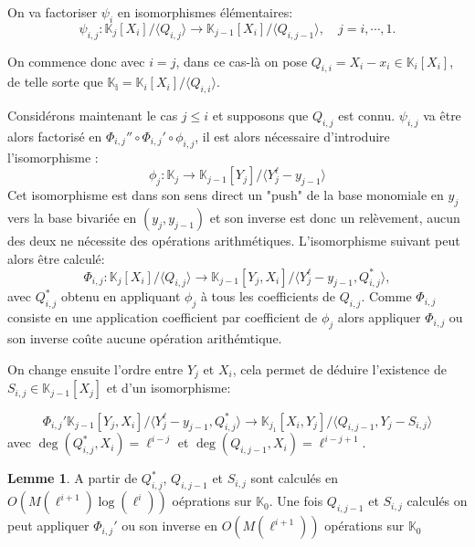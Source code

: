 \documentclass[10pt,a4paper]{book}
\theoremstyle{plain}
\theoremstyle{definition}
\newtheorem{lem}[thm]{Lemme}
\theoremstyle{definition}
\theoremstyle{definition}
\theoremstyle{definition}
\theoremstyle{remark}
\theoremstyle{remark}
\begin{document}
 On va factoriser $\psi_i$ en isomorphismes élémentaires:
 \begin{equation*}
 \psi_{i,j}:\mathbb{K}_{j}[X_i]/\langle Q_{i,j} \rangle \to \mathbb{K}_{j-1}[X_i]/ \langle Q_{i,j-1} \rangle, \quad j=i, \cdots,1. 
 \end{equation*}
 
On commence donc avec $i=j$, dans ce cas-là on pose $Q_{i,i}=X_i-x_i \in \mathbb{K}_i[X_i]$, de telle sorte que $\mathbb{K_i}=\mathbb{K}_i[X_i] / \langle Q_{i,i} \rangle $.

Considérons maintenant le cas $j \leqslant i$ et supposons que $Q_{i,j}$ est connu. $\psi_{i,j}$ va être alors factorisé en $\Phi_{i,j}'' \circ \Phi_{i,j}' \circ \phi_{i,j}$, il est alors nécessaire d'introduire l'isomorphisme :
\begin{equation*}
\phi_j:\mathbb{K}_j \to \mathbb{K}_{j-1}[Y_j]/\langle Y_j^{\ell}-y_{j-1} \rangle
\end{equation*}
Cet isomorphisme est dans son sens direct un "push" de la base monomiale en $y_j$ vers la base bivariée en $(y_j,y_{j-1})$ et son inverse est donc un relèvement, aucun des deux ne nécessite des opérations arithmétiques. L'isomorphisme suivant peut alors être calculé:
\begin{equation*}
\Phi_{i,j}: \mathbb{K}_j[X_i]/\langle Q_{i,j} \rangle \to \mathbb{K}_{j-1}[Y_j,X_i]/\langle Y_j^{\ell}-y_{j-1},Q_{i,j}^* \rangle , 
\end{equation*} 
avec $Q_{i,j}^*$ obtenu en appliquant $\phi_j$ à tous les coefficients de $Q_{i,j}$. Comme $\Phi_{i,j}$ consiste en une application coefficient par coefficient de $\phi_j$ alors appliquer $\Phi_{i,j}$ ou son inverse coûte aucune opération arithémtique.

On change ensuite l'ordre entre $Y_j$ et $X_i$, cela permet de déduire l'existence de $S_{i,j} \in \mathbb{K}_{j-1}[X_j]$ et d'un isomorphisme:

\begin{equation*}
\Phi_{i,j}' \mathbb{K}_{j-1}[Y_j,X_i]/ \langle Y_j^{\ell}-y_{j-1},Q_{i,j}^* \rangle \to \mathbb{K}_{j_1}[X_i,Y_j]/\langle Q_{i,j-1}, Y_j-S_{i,j}\rangle
\end{equation*}
avec $\deg(Q_{i,j}^*,X_i)=\ell^{i-j}$ et $\deg(Q_{i,j-1},X_i)=\ell^{i-j+1}$.

\begin{lem}
A partir de $Q_{i,j}^*$, $Q_{i,j-1}$ et $S_{i,j}$ sont calculés en $O(M(\ell^{i+1})\log(\ell^i))$ oéprations sur $\mathbb{K}_0$. Une fois  $Q_{i,j-1}$ et $S_{i,j}$ calculés on peut appliquer $\Phi_{i,j}'$ ou son inverse en $O(M(\ell^{i+1}))$ opérations sur $\mathbb{K}_0$
\end{lem}
\end{document}
